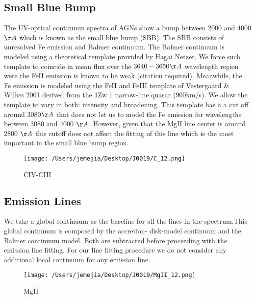 \documentclass[usenatbib]{mn2e}
\begin{document}
\subsection{Small Blue Bump}

The UV-optical continuum spectra of AGNs  show a bump between 2000 and 4000 $\AA$ which is known as the small blue bump (SBB). The SBB  consists  of unresolved Fe emission and Balmer continuum.  
The Balmer continuum is modeled  using a theoretical template provided by Hagai Netzer. We force such template to coincide in mean flux over the $3640-3650 \AA$ wavelength  region were the FeII emission is known to be weak (citation required). Meanwhile, the Fe emission is modeled  using the FeII and FeIII template of  Vestergaard \& Wilkes 2001 derived from the  1Zw 1 narrow-line quasar (900km/s). We allow the template to vary in both: intensity and broadening. 
This template has a a cut off around 3080$\AA$ that does not let us to model the Fe emission for wavelengths between 3080 and 4000 $\AA$. However, given that the MgII line center is around 2800 $\AA$ this cutoff does not affect the fitting of this line which is the most important in the small blue bump region. 


\begin{figure*}
\begin{center}
\texttt{[image: /Users/jemejia/Desktop/J0019/C\_12.png]}
\vspace{5mm}
\end{center} 
\caption{CIV-CIII \label{fig:landscape}}   
\end{figure*}

	
\subsection{Emission Lines}

 We take a global continuum as the baseline for all the lines in the spectrum.This global continuum is composed by the  accretion- disk-model continuum  and the Balmer continuum model. Both are subtracted before proceeding with the emission line fitting. For our line fitting procedure we do not consider any additional local continuum for any emission line. 

\begin{figure*}
\begin{center}
\texttt{[image: /Users/jemejia/Desktop/J0019/MgII\_12.png]}
\vspace{5mm}
\end{center} 
\caption{MgII \label{fig:landscape}}   
\end{figure*}
\end{document}

